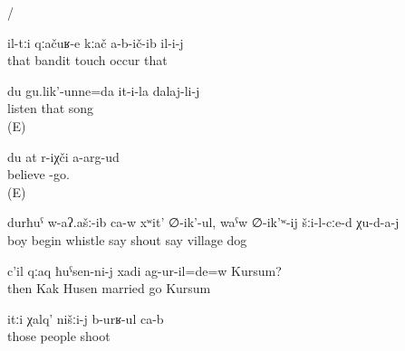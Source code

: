 \begin{exe}
	\ex	\label{ex:extended intransitive verbs}
	\begin{xlist}
		\ex	{} 
		\ex	{} 
		\ex	{} 
		\ex	{} 
		\ex	{} 
		\ex	{} 
		\ex	{} 
		\ex	{}\slash{} 
		\ex	{} 
		\ex	{} 
		\ex	{} 
		\ex	{} 
	\end{xlist}

	\ex	\label{ex:The bandits did not touch him}
	\gll	il-tːi	qːačuʁ-e	kːač	a-b-ič-ib	il-i-j\\
		that	bandit	touch	occur	that\\
	\glt	{}

	\ex	\label{ex:I am listening to her/his song}
	\gll	du 	gu.lik'-unne=da 	it-i-la 	dalaj-li-j\\
			listen	that	song\\
	\glt	{} (E)

	\ex	\label{ex:I (fem.) do not believe (in) you@30a}
	\gll	du	at	r-iχči a-arg-ud\\
				believe -go.\\
	\glt	{} (E)

	\ex	\label{ex:The boy began to whistle and to cry to the dogs in the village}
	\gll	durħuˁ	w-aʔ.ašː-ib ca-w	xʷit'	∅-ik'-ul,	waˁw	∅-ik'ʷ-ij	šːi-l-cːe-d	χu-d-a-j\\
		boy	begin 	whistle	say	shout	say	village	dog\\
	\glt	{}

	\ex	\label{ex:Then did Kursum (fem.) marry Husen (masc.)}
	\gll	c'il	qːaq	ħuˁsen-ni-j	xadi	ag-ur-il=de=w	Kursum?\\
		then	Kak	Husen	married	go	Kursum\\
	\glt	{}

	\ex	\label{ex:‎‎‎The people fought us}
	\gll	itːi	χalq'	nišːi-j	b-urʁ-ul	ca-b\\
		those	people		shoot	\\
	\glt	{}
\end{exe}

